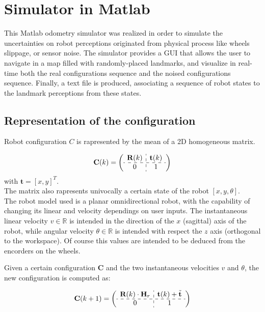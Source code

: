 \section{Simulator in Matlab}\label{sec:matlab_simulator}

This Matlab odometry simulator was realized in order to simulate the uncertainties on robot perceptions originated from physical process like wheels slippage,
or sensor noise.
The simulator provides a GUI that allows the user to navigate in a map filled with randomly-placed landmarks, and visualize in real-time both the real configurations sequence 
and the noised configurations sequence.
Finally, a text file is produced, associating a sequence of robot states to the landmark perceptions from these states.

\subsection{Representation of the configuration}
Robot configuration $C$ is rapresented by the mean of a 2D homogeneous matrix.

\[ 
\textbf{C}(k) = 
\left( \begin{array}{c:c}
  \textbf{R}(k)  & \textbf{t}(k) \\ \hdashline
  0 & 1  \\
\end{array} \right)
\]
with $\textbf{t} = [x,y]^T$.\\

The matrix also rapresents univocally a certain state of the robot $[x,y,\theta]$.
\\
The robot model used is a planar omnidirectional robot, with the capability of changing its linear and velocity dependings on user inputs.
The instantaneous linear velocity $v \in \mathbb{R}$ is intended in the direction of the $x$ (sagittal) axis of the robot, while angular velocity $\theta \in \mathbb{R}$ is
intended with respect the $z$ axis (orthogonal to the workspace).
Of course this values are intended to be deduced from the encorders on the wheels.

Given a certain configuration $\textbf{C}$ and the two instantaneous velocities $v$ and $\theta$, the new configuration is computed as:

\[ 
\textbf{C}(k+1) = 
\left( \begin{array}{c:c}
  \textbf{R}(k) \cdot \textbf{H}_r & \textbf{t}(k) + \tilde{\textbf{t}} \\ \hdashline
  0 & 1  \\
\end{array} \right)
\]

